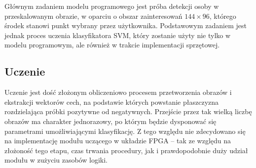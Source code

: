 Głównym zadaniem modelu programowego jest próba detekcji osoby w przeskalowanym obrazie, w oparciu o obszar zainteresowań $144 \times 96$, którego środek stanowi punkt wybrany przez użytkownika. Podstawowym zadaniem jest jednak proces uczenia klasyfikatora SVM, który zostanie użyty nie tylko w modelu programowym, ale również w trakcie implementacji sprzętowej. %

\subsection{Uczenie}
Uczenie jest dość złożonym obliczeniowo procesem przetworzenia obrazów i ekstrakcji wektorów cech, na podstawie których powstanie płaszczyzna rozdzielająca próbki pozytywne od negatywnych. %
Przejście przez tak wielką liczbę obrazów ma charakter jednorazowy, po którym będzie dysponować się parametrami umożliwiającymi klasyfikację. 
Z tego względu nie zdecydowano się na implementację modułu uczącego w układzie FPGA -- tak ze względu na złożoność tego etapu, czas trwania procedury, jak i prawdopodobnie duży udział modułu w zużyciu zasobów logiki. 

